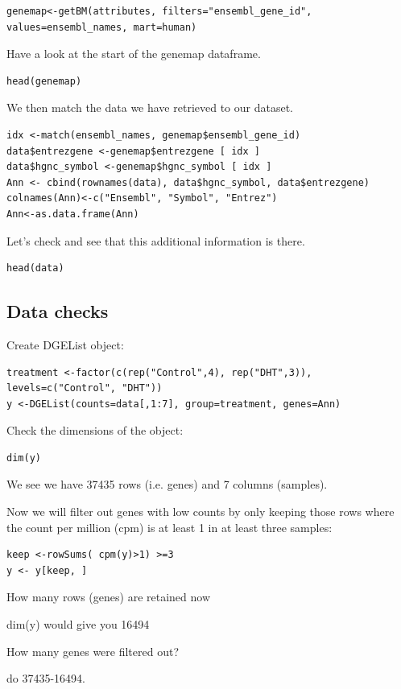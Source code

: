 \begin{steps}
\begin{steps}
\begin{lstlisting}
genemap<-getBM(attributes, filters="ensembl_gene_id", values=ensembl_names, mart=human)
\end{lstlisting}Have a look at the start of the genemap dataframe.

\begin{lstlisting}
head(genemap)
\end{lstlisting}We then match the data we have retrieved to our dataset.

\begin{lstlisting}
idx <-match(ensembl_names, genemap$ensembl_gene_id)
data$entrezgene <-genemap$entrezgene [ idx ]
data$hgnc_symbol <-genemap$hgnc_symbol [ idx ]
Ann <- cbind(rownames(data), data$hgnc_symbol, data$entrezgene)
colnames(Ann)<-c("Ensembl", "Symbol", "Entrez")
Ann<-as.data.frame(Ann)
\end{lstlisting}Let’s check and see that this additional information is there.
\begin{lstlisting}
head(data)
\end{lstlisting}
\end{steps}

\subsection{Data checks}

Create DGEList object:
\begin{lstlisting}
treatment <-factor(c(rep("Control",4), rep("DHT",3)), levels=c("Control", "DHT"))
y <-DGEList(counts=data[,1:7], group=treatment, genes=Ann)
\end{lstlisting}



Check the dimensions of the object:
\begin{lstlisting}
dim(y)
\end{lstlisting}

We see we have 37435 rows (i.e. genes) and 7 columns (samples).

Now we will filter out genes with low counts by only keeping those rows where the count
per million (cpm) is at least 1 in at least three samples:
\begin{lstlisting}
keep <-rowSums( cpm(y)>1) >=3
y <- y[keep, ]
\end{lstlisting}

\end{steps}

\begin{questions}
How many rows (genes) are retained now
\begin{answer}
dim(y) would give you 16494
\end{answer}

How many genes were filtered out?
\begin{answer}
do 37435-16494.
\end{answer}
\end{questions}


